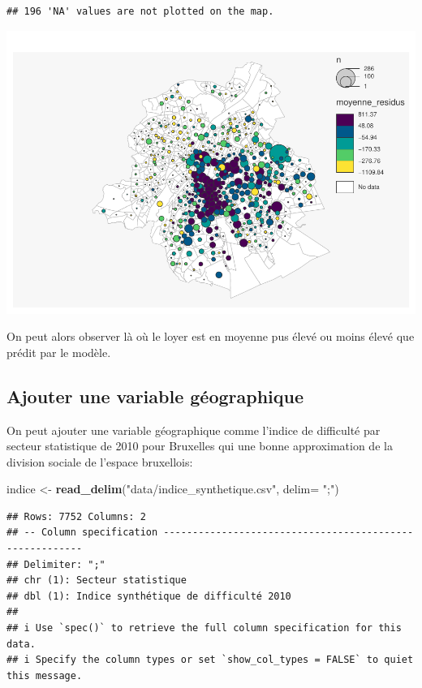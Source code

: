 \documentclass[
]{book}
\newenvironment{Shaded}{\begin{snugshade}}{\end{snugshade}}
\newcommand{\AttributeTok}[1]{\textcolor[rgb]{0.13,0.29,0.53}{#1}}
\newcommand{\FunctionTok}[1]{\textcolor[rgb]{0.13,0.29,0.53}{\textbf{#1}}}
\newcommand{\NormalTok}[1]{#1}
\newcommand{\OtherTok}[1]{\textcolor[rgb]{0.56,0.35,0.01}{#1}}
\newcommand{\StringTok}[1]{\textcolor[rgb]{0.31,0.60,0.02}{#1}}
\begin{document}
\begin{verbatim}
## 196 'NA' values are not plotted on the map.
\end{verbatim}

\includegraphics{manuel_geo_quanti_files/figure-latex/unnamed-chunk-28-1.pdf}

On peut alors observer là où le loyer est en moyenne pus élevé ou moins
élevé que prédit par le modèle.

\hypertarget{ajouter-une-variable-guxe9ographique}{%
\subsection{Ajouter une variable géographique}\label{ajouter-une-variable-guxe9ographique}}

On peut ajouter une variable géographique comme l'indice de difficulté
par secteur statistique de 2010 pour Bruxelles qui une bonne
approximation de la division sociale de l'espace bruxellois:

\begin{Shaded}
\begin{Highlighting}[]
\NormalTok{indice }\OtherTok{\textless{}{-}} \FunctionTok{read\_delim}\NormalTok{(}\StringTok{"data/indice\_synthetique.csv"}\NormalTok{, }\AttributeTok{delim=} \StringTok{";"}\NormalTok{)}
\end{Highlighting}
\end{Shaded}

\begin{verbatim}
## Rows: 7752 Columns: 2
## -- Column specification --------------------------------------------------------
## Delimiter: ";"
## chr (1): Secteur statistique
## dbl (1): Indice synthétique de difficulté 2010
## 
## i Use `spec()` to retrieve the full column specification for this data.
## i Specify the column types or set `show_col_types = FALSE` to quiet this message.
\end{verbatim}
\end{document}
